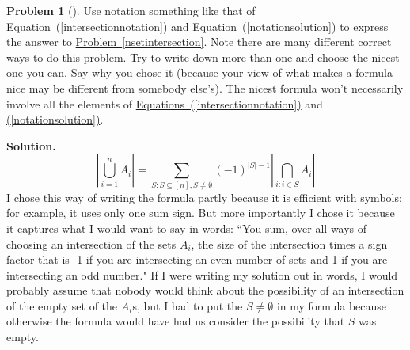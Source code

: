 \documentclass[10pt,]{book}
\theoremstyle{plain}
\theoremstyle{definition}
\newtheorem{activity}[project]{Problem}
\theoremstyle{definition}
\numberwithin{equation}{chapter}
\begin{document}
\begin{activity}[]\label{inclusion-exclusionunion}
Use notation something like that of \hyperref[intersectionnotation]{Equation~(\ref{intersectionnotation})} and \hyperref[notationsolution]{Equation~(\ref{notationsolution})} to express the answer to \hyperref[nsetintersection]{Problem~\ref{nsetintersection}}. Note there are many different correct ways to do this problem. Try to write down more than one and choose the nicest one you can. Say why you chose it (because your view of what makes a formula nice may be different from somebody else's). The nicest formula won't necessarily involve all the elements of \hyperref[intersectionnotation]{Equations~(\ref{intersectionnotation})} and \hyperref[notationsolution]{(\ref{notationsolution})}.%
\par\medskip\noindent%
\textbf{Solution.}\quad %
\begin{equation*}
\left|\bigcup_{i=1}^n A_i\right| = \sum_{S:S\subseteq [n],
S\not=\emptyset}(-1)^{|S|-1}|\bigcap_{i: i\in S}A_i|
\end{equation*}
I chose this way of writing the formula partly because it is efficient with symbols; for example, it uses only one sum sign. But more importantly I chose it because it captures what I would want to say in words: ``You sum, over all ways of choosing an intersection of the sets \(A_i\), the size of the intersection times a sign factor that is -1 if you are intersecting an even number of sets and 1 if you are intersecting an odd number." If I were writing my solution out in words, I would probably assume that nobody would think about the possibility of an intersection of the empty set of the \(A_i\)s, but I had to put the \(S\not=\emptyset\) in my formula because otherwise the formula would have had us consider the possibility that \(S\) was empty.%
\end{activity}
\end{document}
